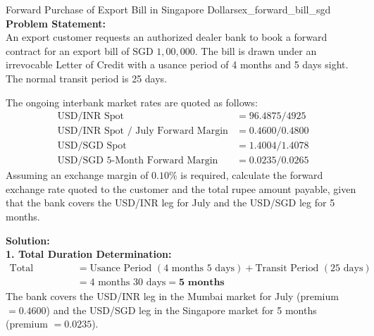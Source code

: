 \clearpage

\begin{example}{Forward Purchase of Export Bill in Singapore Dollars}{ex_forward_bill_sgd}
\textbf{Problem Statement:}\\
An export customer requests an authorized dealer bank to book a forward contract for an export bill of $\text{SGD } 1{,}00{,}000$. The bill is drawn under an irrevocable Letter of Credit with a usance period of 4 months and 5 days sight. The normal transit period is 25 days.

The ongoing interbank market rates are quoted as follows:
\begin{align*}
    \text{USD/INR Spot} &= 96.4875 / 4925 \\
    \text{USD/INR Spot / July Forward Margin} &= 0.4600 / 0.4800 \\
    \text{USD/SGD Spot} &= 1.4004 / 1.4078 \\
    \text{USD/SGD 5-Month Forward Margin} &= 0.0235 / 0.0265
\end{align*}
Assuming an exchange margin of $0.10\%$ is required, calculate the forward exchange rate quoted to the customer and the total rupee amount payable, given that the bank covers the USD/INR leg for July and the USD/SGD leg for 5 months.

\tcblower
\textbf{Solution:}\\
\noindent\textbf{1. Total Duration Determination:}\\
\begin{align*}
    \text{Total Duration} &= \text{Usance Period } (4\text{ months } 5\text{ days}) + \text{Transit Period } (25\text{ days}) \\
                          &= 4\text{ months } 30\text{ days} = \mathbf{5 \text{ months}}
\end{align*}
The bank covers the USD/INR leg in the Mumbai market for July (premium $= 0.4600$) and the USD/SGD leg in the Singapore market for 5 months (premium $= 0.0235$).


\end{example}
